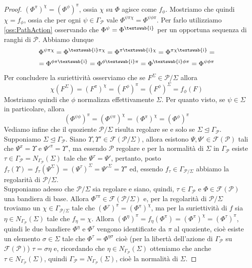 \documentclass[a4paper,12pt]{report}
\newcommand{\p}{\mathcal{P}}
\theoremstyle{plain}
\theoremstyle{definition}
\newcommand\multi[1]{\text{\textswab{#1}}}
\newcommand\flag[1]{\mathcal{F}(#1)}
\begin{document}
\begin{proof}
$(\Phi^\pi)^\chi=(\Phi^\phi)^\pi$, ossia $\chi$ su $\Phi$ agisce come $f_\phi$.
Mostriamo che quindi $\chi=f_\phi$, ossia che per ogni $\psi\in\Gamma_\p$ vale $\Phi^{\psi\pi\chi}=\Phi^{\psi\phi\pi}$.
Per farlo utilizziamo \ref{oss:PathAction} osservando che $\Phi^\psi=\Phi^\multi{i}$ per un opportuna sequenza di ranghi di $\p$. Abbiamo
dunque
\begin{gather*}
\Phi^{\psi\pi\chi}=\Phi^{\multi{i}\pi\chi}=\Phi^{\pi\multi{i}\chi}=\Phi^{\pi\chi\multi{i}}=\\
=\Phi^{\phi\pi\multi{i}}=\Phi^{\phi\multi{i}\pi}=\Phi^{\multi{i}\phi\pi}=\Phi^{\psi\phi\pi}
\end{gather*}
Per concludere la suriettivit\`a osserviamo che se $F^\Sigma\in\p/\Sigma$ allora
\begin{equation*}
\chi(F^\Sigma)=(F^\pi)^\chi=(F^\phi)^\pi=(F^\phi)^\Sigma=f_\phi(F)
\end{equation*}
Mostriamo quindi che $\phi$ normalizza effettivamente $\Sigma$. Per quanto visto, se $\psi\in\Sigma$ in particolare, allora
\begin{equation*}
(\Phi^{\psi\phi})^\pi=(\Phi^{\psi\pi})^\chi=(\Phi^\pi)^\chi=(\Phi^\phi)^\pi
\end{equation*}
Vediamo infine che il quoziente $\p/\Sigma$ risulta regolare se e solo se $\Sigma\trianglelefteq\Gamma_\p$. Supponiamo
$\Sigma\trianglelefteq\Gamma_\p$. Siano $\Upsilon,
\Upsilon'\in\flag{\p/\Sigma}$, allora esistono $\Psi,\Psi'\in\flag{\p}$ tali che $\Psi^\pi=\Upsilon$ e $\Psi'^\pi=\Upsilon'$,
ma essendo $\p$ regolare e per la normalit\`a di $\Sigma$ in $\Gamma_\p$ esiste $\tau\in\Gamma_\p=N_{\Gamma_\p}(\Sigma)$
tale che $\Psi^\tau=\Psi'$, pertanto, posto $f_\tau(\Upsilon)=f_\tau(\Psi^\Sigma)=(\Psi^\tau)^\Sigma=\Psi'^\Sigma=\Upsilon'$
ed, essendo $f_\tau\in\Gamma_{\p/\Sigma}$ abbiamo la regolarit\`a di $\p/\Sigma$.\\
Supponiamo adesso che $\p/\Sigma$ sia regolare e siano, quindi, $\tau\in\Gamma_\p$ e $\Phi\in\flag{\p}$ una bandiera di base. Allora
$\Phi^{\tau\pi}\in\flag{\p/\Sigma}$ e, per la regolarit\`a di $\p/\Sigma$ troviamo un $\chi\in\Gamma_{\p/\Sigma}$ tale che
$(\Phi^\tau)^\pi=(\Phi^\pi)^\chi$, ma per la suriettivit\`a di $f$ sia $\eta\in N_{\Gamma_\p}(\Sigma)$ tale che $f_\eta=\chi$. Allora
$(\Phi^\eta)^\pi=f_\eta(\Phi^\pi)=(\Phi^\pi)^\chi=(\Phi^\tau)^\pi$, quindi le due bandiere $\Phi^\eta$ e $\Phi^\tau$ vengono
identificate da $\pi$ al quoziente, cio\`e esiste un elemento $\sigma\in\Sigma$ tale che $\Phi^\tau=\Phi^{\eta\sigma}$ cio\`e
(per la libert\`a dell'azione di $\Gamma_\p$ su $\flag{\p}$) $\tau=\sigma\eta$ e, ricordando che $\eta\in N_{\Gamma_\p}(\Sigma)$
otteniamo che anche $\tau\in N_{\Gamma_\p}(\Sigma)$, quindi $\Gamma_\p=N_{\Gamma_\p}(\Sigma)$, cio\`e la normalit\`a di $\Sigma$.
\end{proof}
\end{document}

